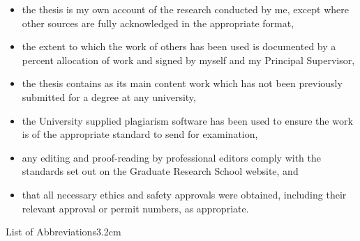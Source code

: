 \documentclass[a4paper, nobind]{templates/ociamthesis}
\providecommand{\tightlist}{%
  \setlength{\itemsep}{0pt}\setlength{\parskip}{0pt}}
\begin{document}
\begin{romanpages}
\begin{declaration}
  \begin{itemize}
  \tightlist
  \item
    the thesis is my own account of the research conducted by me, except where other sources are fully acknowledged in the appropriate format,
  \item
    the extent to which the work of others has been used is documented by a percent allocation of work and signed by myself and my Principal Supervisor,
  \item
    the thesis contains as its main content work which has not been previously submitted for a degree at any university,
  \item
    the University supplied plagiarism software has been used to ensure the work is of the appropriate standard to send for examination,
  \item
    any editing and proof-reading by professional editors comply with the standards set out on the Graduate Research School website, and
  \item
    that all necessary ethics and safety approvals were obtained, including their relevant approval or permit numbers, as appropriate.
  \end{itemize}
\end{declaration}


  \dominitoc %

\flushbottom

\tableofcontents

\listoffigures
	\mtcaddchapter

\listoftables
  \mtcaddchapter
\begin{mclistof}{List of Abbreviations}{3.2cm}


\end{mclistof}
\end{romanpages}
\end{document}
